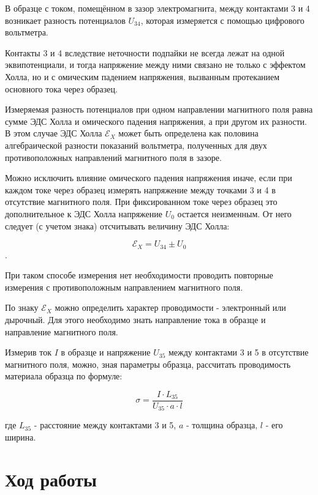   	В образце с током, помещённом в зазор электромагнита, между контактами 3 и 4 возникает разность потенциалов $U_{34}$, которая измеряется с помощью цифрового вольтметра.
  	
  	Контакты 3 и 4 вследствие неточности подпайки не всегда лежат на одной
  	эквипотенциали, и тогда напряжение между ними связано не только с эффектом
  	Холла, но и с омическим падением напряжения, вызванным протеканием основного тока через образец.
  	
  	Измеряемая разность потенциалов при одном направлении
  	магнитного поля равна сумме ЭДС Холла и омического падения напряжения, а
  	при другом  их разности. В этом случае ЭДС Холла $\mathscr{E}_{X}$ может быть определена как половина алгебраической разности показаний вольтметра, полученных для
  	двух противоположных направлений магнитного поля в зазоре.
  	
  	Можно исключить влияние омического падения напряжения иначе, если при каждом токе через образец измерять напряжение между точками 3 и 4 в отсутствие магнитного поля. При фиксированном токе через образец это дополнительное к ЭДС Холла напряжение $U_{0}$ остается неизменным. От него следует (с учетом
  	знака) отсчитывать величину ЭДС Холла: 
  	
  	$$\mathscr{E}_{X} = U_{34} \pm U_{0}$$. 
  	
  	При таком способе измерения нет необходимости проводить повторные измерения с противоположным направлением магнитного поля.
  	
  	
  	По знаку $\mathscr{E}_{X}$ можно определить характер проводимости - электронный или дырочный. Для этого необходимо знать направление тока в образце и направление
  	магнитного поля.
  	
  	Измерив ток $I$ в образце и напряжение $U_{35}$ между контактами 3 и 5 в отсутствие магнитного поля, можно, зная параметры образца, рассчитать проводимость материала образца по формуле:
  	
  \begin{equation}\label{sigma}
  	\sigma=\dfrac{I\cdot L_{35}}{U_{35}\cdot a\cdot l}
  \end{equation}
  	
  	где $L_{35}$ - расстояние между контактами 3 и 5, $a$ - толщина образца, $l$ - его ширина.


\section{{Ход работы}}

